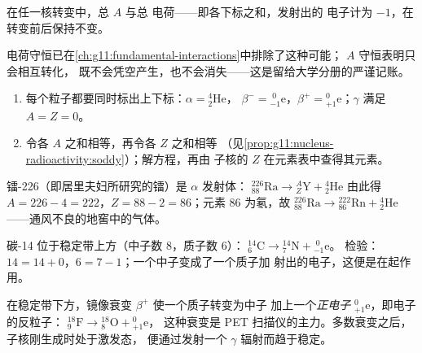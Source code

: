 \begin{proposition}[核反应方程中的守恒]\label{prop:g11:nucleus-radioactivity:soddy}
在任一核转变中，总 $A$ 与总
电荷——即各下标之和，发射出的
电子计为 $-1$，在转变前后保持不变。
\end{proposition}
\admitted

\begin{remark}
电荷守恒已在\cref{ch:g11:fundamental-interactions}中排除了这种可能；
$A$ 守恒表明只会相互转化，
既不会凭空产生，也不会消失——这是留给大学分册的严谨记账。
\end{remark}

\begin{method}[配平衰变方程]\label{met:g11:nucleus-radioactivity:balance}
\begin{enumerate}
  \item 每个粒子都要同时标出上下标：$\alpha = {}^{4}_{2}\mathrm{He}$，
        $\beta^- = {}^{\;0}_{-1}\mathrm{e}$，$\beta^+ = {}^{0}_{+1}\mathrm{e}$；$\gamma$ 满足 $A = Z = 0$。
  \item 令各 $A$ 之和相等，再令各 $Z$ 之和相等
        （见\cref{prop:g11:nucleus-radioactivity:soddy}）；解方程，再由
        子核的 $Z$ 在元素表中查得其元素。
\end{enumerate}
\end{method}

\begin{example}[α 衰变]\label{ex:g11:nucleus-radioactivity:alpha}
镭-226（即居里夫妇所研究的镭）是 $\alpha$ 发射体：
${}^{226}_{88}\mathrm{Ra} \to {}^{A}_{Z}\mathrm{Y} + {}^{4}_{2}\mathrm{He}$
由此得 $A = 226 - 4 = 222$，$Z = 88 - 2 = 86$；元素 $86$ 为氡，故
${}^{226}_{88}\mathrm{Ra} \to {}^{222}_{86}\mathrm{Rn} + {}^{4}_{2}\mathrm{He}$
——通风不良的地窖中的气体。
\end{example}

\begin{example}[负 β 衰变]\label{ex:g11:nucleus-radioactivity:beta}
碳-14 位于稳定带上方（中子数 $8$，质子数 $6$）：
${}^{14}_{6}\mathrm{C} \to {}^{14}_{7}\mathrm{N} + {}^{\;0}_{-1}\mathrm{e}$。
检验：$14 = 14 + 0$，$6 = 7 - 1$；一个中子变成了一个质子加
射出的电子，这便是在起作用。
\end{example}

\begin{remark}[正 β 衰变与 γ 辐射]\label{rem:g11:nucleus-radioactivity:betaplus}
在稳定带下方，镜像衰变 $\beta^+$ 使一个质子转变为中子
加上一个\emph{正电子} ${}^{0}_{+1}\mathrm{e}$，即电子的反粒子：
${}^{18}_{9}\mathrm{F} \to {}^{18}_{8}\mathrm{O} + {}^{0}_{+1}\mathrm{e}$，
这种衰变是 PET 扫描仪的主力。多数衰变之后，子核刚生成时处于激发态，
便通过发射一个 $\gamma$ 辐射而趋于稳定。
\end{remark}

